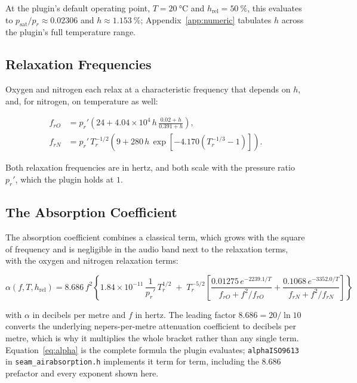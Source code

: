 \documentclass[11pt,a4paper]{article}
\begin{document}
At the plugin's default operating point, $T = \SI{20}{\celsius}$ and $h_\text{rel} = \SI{50}{\percent}$, this evaluates to $p_\text{sat}/p_r \approx 0.02306$ and $h \approx \SI{1.153}{\percent}$; Appendix~\ref{app:numeric} tabulates $h$ across the plugin's full temperature range.

\subsection{Relaxation Frequencies}

Oxygen and nitrogen each relax at a characteristic frequency that depends on $h$, and, for nitrogen, on temperature as well:

\begin{align}
f_{rO} &= p_r' \left( 24 + 4.04\times10^{4}\, h \, \frac{0.02+h}{0.391+h} \right) , \\
f_{rN} &= p_r' \, T_r^{-1/2} \left( 9 + 280\, h \, \exp\!\left[-4.170\left(T_r^{-1/3}-1\right)\right] \right) .
\end{align}

Both relaxation frequencies are in hertz, and both scale with the pressure ratio $p_r'$, which the plugin holds at $1$.

\subsection{The Absorption Coefficient}

The absorption coefficient combines a classical term, which grows with the square of frequency and is negligible in the audio band next to the relaxation terms, with the oxygen and nitrogen relaxation terms:

\begin{equation}
\alpha(f,T,h_\text{rel}) = 8.686\, f^{2}
\left\{
  1.84\times10^{-11} \, \frac{1}{p_r'} \, T_r^{1/2}
  \;+\;
  T_r^{-5/2}
  \left[
    \frac{0.01275 \, e^{-2239.1/T}}{f_{rO} + f^{2}/f_{rO}}
    +
    \frac{0.1068 \, e^{-3352.0/T}}{f_{rN} + f^{2}/f_{rN}}
  \right]
\right\}
\label{eq:alpha}
\end{equation}

with $\alpha$ in decibels per metre and $f$ in hertz.
The leading factor $8.686 = 20/\ln 10$ converts the underlying nepers-per-metre attenuation coefficient to decibels per metre, which is why it multiplies the whole bracket rather than any single term.
Equation~\eqref{eq:alpha} is the complete formula the plugin evaluates; \texttt{alphaISO9613} in \texttt{seam\_airabsorption.h} implements it term for term, including the $8.686$ prefactor and every exponent shown here.
\end{document}
